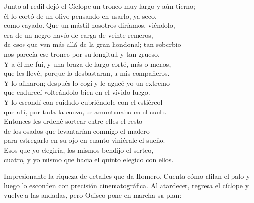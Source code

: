 \begin{versocita}
Junto al redil dejó el Cíclope un tronco muy largo y aún tierno;\\
él lo cortó de un olivo pensando en usarlo, ya seco,\\
como cayado. Que un mástil nosotros diríamos, viéndolo,\\
era de un negro navío de carga de veinte remeros,\\
de esos que van más allá de la gran hondonal; tan soberbio\\
nos parecía ese tronco por su longitud y tan grueso.\\
Y a él me fui, y una braza de largo corté, más o menos,\\
que les llevé, porque lo desbastaran, a mis compañeros.\\
Y lo afinaron; después lo cogí y le agucé yo un extremo\\
que endurecí volteándolo bien en el vívido fuego.\\
\stanzabreak
Y lo escondí con cuidado cubriéndolo con el estiércol\\
que allí, por toda la cueva, se amontonaba en el suelo.\\
Entonces les ordené sortear entre ellos el resto\\
de los osados que levantarían conmigo el madero\\
para estregarlo en su ojo en cuanto viniérale el sueño.\\
Esos que yo elegiría, los mismos bendijo el sorteo,\\
cuatro, y yo mismo que hacía el quinto elegido con ellos.
\end{versocita}

Impresionante la riqueza de detalles que da Homero. Cuenta cómo afilan el palo y luego lo esconden con precisión cinematográfica. Al atardecer, regresa el cíclope y vuelve a las andadas, pero Odiseo pone en marcha su plan:

